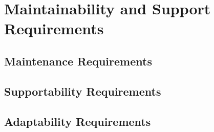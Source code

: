 \section{Maintainability and Support Requirements}
\subsection{Maintenance Requirements}
\subsection{Supportability Requirements}
\subsection{Adaptability Requirements}